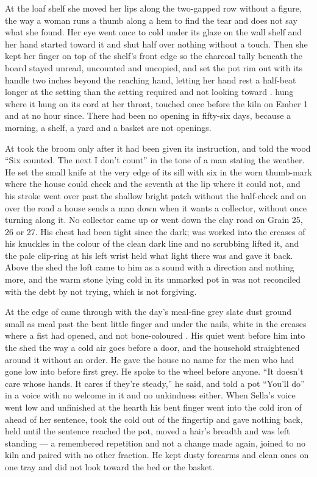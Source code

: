 At the loaf shelf she moved her lips along the two-gapped row without a figure, the way a woman runs a thumb along a hem to find the tear and does not say what she found. Her eye went once to  cold under its glaze on the wall shelf and her hand started toward it and shut half over nothing without a touch. Then she kept her finger on top of the shelf's front edge so the charcoal tally beneath the board stayed unread, uncounted and uncopied, and set the pot rim out with its handle two inches beyond the reaching hand, letting her hand rest a half-beat longer at the setting than the setting required and not looking toward .  hung where it hung on its cord at her throat, touched once before the kiln on Ember 1 and at no hour since. There had been no opening in fifty-six days, because a morning, a shelf, a yard and a basket are not openings.

At   took the broom only after it had been given its instruction, and told the wood “Six counted. The next I don't count” in the tone of a man stating the weather. He set the small knife at the very edge of its sill with six in the worn thumb-mark where the house could check and the seventh at the lip where it could not, and his stroke went over  past the shallow bright patch without the half-check and on over the road a house sends a man down when it wants a collector, without once turning along it. No collector came up or went down the clay road on Grain 25, 26 or 27. His chest had been tight since the dark;  was worked into the creases of his knuckles in the colour of the clean dark line and no scrubbing lifted it, and the pale clip-ring at his left wrist held what light there was and gave it back. Above the shed the loft came to him as a sound with a direction and nothing more, and the warm stone lying cold in its unmarked pot in  was not reconciled with the debt by not trying, which is not forgiving.

At the edge of   came through with the day's meal-fine grey slate dust ground small as meal past the bent little finger and under the nails, white in the creases where a fist had opened, and not bone-coloured . His quiet went before him into the shed the way a cold air goes before a door, and the household straightened around it without an order. He gave the house no name for the men who had gone low into  before first grey. He spoke to the wheel before anyone. “It doesn't care whose hands. It cares if they're steady,” he said, and told a pot “You'll do” in a voice with no welcome in it and no unkindness either. When Sella's voice went low and unfinished at the hearth his bent finger went into the cold iron of  ahead of her sentence, took the cold out of the fingertip and gave nothing back, held until the sentence reached the pot, moved a hair's breadth and was left standing --- a remembered repetition and not a change made again, joined to no kiln and paired with no other fraction. He kept dusty forearms and clean ones on one tray and did not look toward the bed or the basket.

